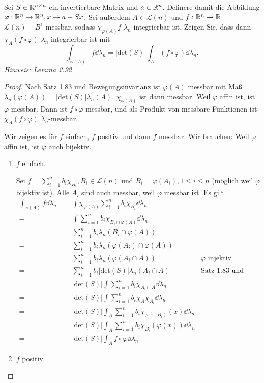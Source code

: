 \begin{Problem}
	Sei $S\in \mathbb{R}^{n\times n}$ ein invertierbare Matrix und $a\in \mathbb{R}^n$. Definere damit die Abbildung $\varphi:\mathbb{R}^n\to \mathbb{R}^n, x\to a+Sx$. Sei außerdem $A\in \mathcal{L}(n)$ und $f:\mathbb{R}^n\to \mathbb{R}$ $\mathcal{L}(n)-B^1$ messbar, sodass $\chi_{\varphi(A)}f$ $\lambda_n$ integrierbar ist. Zeigen Sie, dass dann $\chi_A(f\circ \varphi)$ $\lambda_n$-integrierbar ist mit
	\[
		\int_{\varphi(A)}f\dd{\lambda_n}=|\text{det}(S)|\int_A (f\circ\varphi) \dd{\lambda_n}
	.\] 
	{\footnotesize \emph{Hinweis: Lemma 2.92}}
\end{Problem}
\begin{proof}
	Nach Satz 1.83 und Bewegungsinvarianz ist $\varphi(A)$ messbar mit Maß $\lambda_n(\varphi(A))=|\text{det}(S)|\lambda_n(A)$. $\chi_{\varphi(A)}$ ist dann messbar. Weil $\varphi$ affin ist, ist $\varphi$ messbar. Dann ist $f\circ\varphi$ messbar, und als Produkt von messbare Funktionen ist $\chi_A(f\circ \varphi)$ $\lambda_n$-messbar.

	Wir zeigen es f\"{u}r $f$ einfach, $f$ positiv und dann $f$ messbar. Wir brauchen: Weil $\varphi$ affin ist, ist $\varphi$ auch bijektiv. 
	\begin{enumerate}[label=(\roman*)]
		\item $f$ einfach. 

			Sei $f=\sum_{i=1}^n b_i\chi_{B_i},B_i\in \mathcal{L}(n)$ und $B_i=\varphi(A_i),1\le i\le n$ (möglich weil $\varphi$ bijektiv ist). Alle $A_i$ sind auch messbar, weil $\varphi$ messbar ist. Es gilt
			\begin{align*}
				\int_{\varphi(A)}f\dd{\lambda_n}=&\int \chi_{\varphi(A)}\sum_{i=1}^n b_i \chi_{B_i}\dd{\lambda_n}\\
				=&\int\sum_{i=1}^n b_i\chi_{B_i\cap \varphi(A)}\dd{\lambda_n}\\
				=&\sum_{i=1}^n b_i\lambda_n(B_i\cap \varphi(A))\\
				=&\sum_{i=1}^n b_i\lambda_n(\varphi(A_i)\cap \varphi(A))\\
				=&\sum_{i=1}^n b_i \lambda_n(\varphi(A_i\cap A)) & \varphi\text{ injektiv}\\
				=&\sum_{i=1}^n b_i|\text{det}(S)|\lambda_n(A_i\cap A) & \text{Satz 1.83 und Bewegungsinvarianz}\\
				=&|\text{det}(S)|\int\sum_{i=1}^n b_i\chi_{A_i\cap A}\dd{\lambda_n}\\
				=&|\text{det}(S)|\int\sum_{i=1}^n b_i \chi_{A}\chi_{A_i}\dd{\lambda_n}\\
				=&|\text{det}(S)|\int_A\sum_{i=1}^n b_i\chi_{\varphi^{-1}(B_i)}(x)\dd{\lambda_n}\\
				=&|\text{det}(S)|\int_A\sum_{i=1}^n b_i\chi_{B_i}(\varphi(x))\dd{\lambda_n}\\
				=&|\text{det}(S)|\int_A f\circ \varphi\dd{\lambda_n}
			\end{align*}
		\item $f$ positiv
	\end{enumerate}
\end{proof}

